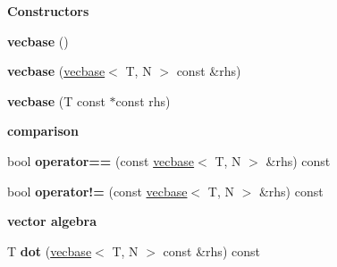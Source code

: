 \begin{Indent}{\bf Constructors}\par
{\em \label{_amgrp559a25fdb98a7d1fd1c3771ac568d5e9}
 }\begin{DoxyCompactItemize}
\item 
\hypertarget{classmath_1_1vecbase_a1564ba1323c81cd57cf169a95392c7e8}{
{\bfseries vecbase} ()}
\label{classmath_1_1vecbase_a1564ba1323c81cd57cf169a95392c7e8}

\item 
\hypertarget{classmath_1_1vecbase_ab43c3f6756f33a67566089ade789e6e7}{
{\bfseries vecbase} (\hyperlink{classmath_1_1vecbase}{vecbase}$<$ T, N $>$ const \&rhs)}
\label{classmath_1_1vecbase_ab43c3f6756f33a67566089ade789e6e7}

\item 
\hypertarget{classmath_1_1vecbase_ace789b2c8321e0d058b5cd143df2e439}{
{\bfseries vecbase} (T const $\ast$const rhs)}
\label{classmath_1_1vecbase_ace789b2c8321e0d058b5cd143df2e439}

\end{DoxyCompactItemize}
\end{Indent}
\begin{Indent}{\bf comparison}\par
{\em \label{_amgrp347cd68a17ba31d02e83262794a3c9e3}
 }\begin{DoxyCompactItemize}
\item 
\hypertarget{classmath_1_1vecbase_a81f417a49e0e2c3e4e76b0799cbc0ec2}{
bool {\bfseries operator==} (const \hyperlink{classmath_1_1vecbase}{vecbase}$<$ T, N $>$ \&rhs) const }
\label{classmath_1_1vecbase_a81f417a49e0e2c3e4e76b0799cbc0ec2}

\item 
\hypertarget{classmath_1_1vecbase_acd1de2124460ee7ef9dea51ad7647ea3}{
bool {\bfseries operator!=} (const \hyperlink{classmath_1_1vecbase}{vecbase}$<$ T, N $>$ \&rhs) const }
\label{classmath_1_1vecbase_acd1de2124460ee7ef9dea51ad7647ea3}

\end{DoxyCompactItemize}
\end{Indent}
\begin{Indent}{\bf vector algebra}\par
{\em \label{_amgrpf3df6783d0cca6c1ea518af64ed4d647}
 }\begin{DoxyCompactItemize}
\item 
\hypertarget{classmath_1_1vecbase_a4b96583fae6e131eddefa796b5f31809}{
T {\bfseries dot} (\hyperlink{classmath_1_1vecbase}{vecbase}$<$ T, N $>$ const \&rhs) const }
\label{classmath_1_1vecbase_a4b96583fae6e131eddefa796b5f31809}

\end{DoxyCompactItemize}
\end{Indent}
